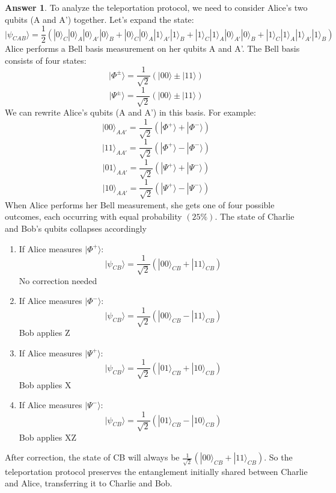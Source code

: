 \documentclass[12pt]{article}
\newcommand{\ket}[1]{|#1\rangle}
\theoremstyle{plain}
\theoremstyle{definition}
\newtheorem{ans}{Answer}
\begin{document}
\noindent \hrulefill

\begin{ans}
	To analyze the teleportation protocol, we need to consider Alice's two qubits (A and A') together. Let's expand the state:
    \[\ket{\psi_{CAB}} = \frac{1}{2}(\ket{0}_C\ket{0}_A\ket{0}_{A'}\ket{0}_B + \ket{0}_C\ket{0}_A\ket{1}_{A'}\ket{1}_B + \ket{1}_C\ket{1}_A\ket{0}_{A'}\ket{0}_B + \ket{1}_C\ket{1}_A\ket{1}_{A'}\ket{1}_B)\]
    Alice performs a Bell basis measurement on her qubits A and A'. The Bell basis consists of four states:
    \[\ket{\Phi^{\pm}} = \frac{1}{\sqrt{2}}(\ket{00} \pm \ket{11})\]
    \[\ket{\Psi^{\pm}} = \frac{1}{\sqrt{2}}(\ket{00} \pm \ket{11})\]
    We can rewrite Alice's qubits (A and A') in this basis. For example:
    \[\ket{00}_{AA'} = \frac{1}{\sqrt{2}}(\ket{\Phi^+} + \ket{\Phi^-})\]
    \[\ket{11}_{AA'} = \frac{1}{\sqrt{2}}(\ket{\Phi^+} - \ket{\Phi^-})\]
    \[\ket{01}_{AA'} = \frac{1}{\sqrt{2}}(\ket{\Psi^+} + \ket{\Psi^-})\]
    \[\ket{10}_{AA'} = \frac{1}{\sqrt{2}}(\ket{\Psi^+} - \ket{\Psi^-})\]
    When Alice performs her Bell measurement, she gets one of four possible outcomes, each occurring with equal probability $(25\%)$. The state of Charlie and Bob's qubits collapses accordingly
    \begin{enumerate}
        \item If Alice measures $\ket{\Phi^+}$: 
            \[\ket{\psi_{CB}} = \frac{1}{\sqrt{2}}(\ket{00}_{CB} + \ket{11}_{CB})\]
            No correction needed
        \item If Alice measures $\ket{\Phi^-}$: 
            \[\ket{\psi_{CB}} = \frac{1}{\sqrt{2}}(\ket{00}_{CB} - \ket{11}_{CB})\]
            Bob applies Z
        \item If Alice measures $\ket{\Psi^+}$: 
            \[\ket{\psi_{CB}} = \frac{1}{\sqrt{2}}(\ket{01}_{CB} + \ket{10}_{CB})\]
            Bob applies X
        \item If Alice measures $\ket{\Psi^-}$: 
            \[\ket{\psi_{CB}} = \frac{1}{\sqrt{2}}(\ket{01}_{CB} - \ket{10}_{CB})\]
            Bob applies XZ
    \end{enumerate}
    After correction, the state of CB will always be $\frac{1}{\sqrt{2}}(\ket{00}_{CB} + \ket{11}_{CB})$. So the teleportation protocol preserves the entanglement initially shared between Charlie and Alice, transferring it to Charlie and Bob.
    
\end{ans}

\noindent \hrulefill
\end{document}
